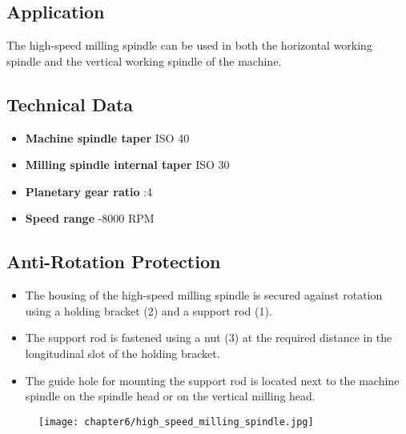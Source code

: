 

\setcounter{section}{2}

\subsection*{Application}
The high-speed milling spindle can be used in both the horizontal working spindle and the vertical working spindle of the machine.

\subsection*{Technical Data}
\begin{itemize}
    \item \textbf{Machine spindle taper} \dotfill ISO 40
    \item \textbf{Milling spindle internal taper} \dotfill ISO 30
    \item \textbf{Planetary gear ratio} :4
    \item \textbf{Speed range} -8000 RPM\footnotemark[1]
\end{itemize}

\subsection*{Anti-Rotation Protection}
\begin{itemize}
    \item The housing of the high-speed milling spindle is secured against rotation using a holding bracket (2) and a support rod (1).
    \item The support rod is fastened using a nut (3) at the required distance in the longitudinal slot of the holding bracket.
    \item The guide hole for mounting the support rod is located next to the machine spindle on the spindle head or on the vertical milling head.
\end{itemize}

\begin{figure}[h]
    \centering
    \texttt{[image: chapter6/high\_speed\_milling\_spindle.jpg]}
\end{figure}

